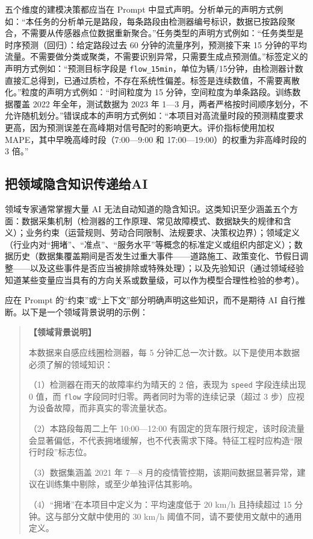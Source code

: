 五个维度的建模决策都应当在 Prompt 中显式声明。分析单元的声明方式例如：“本任务的分析单元是路段，每条路段由检测器编号标识，数据已按路段聚合，不需要从传感器点位数据重新聚合。”任务类型的声明方式例如：“任务类型是时序预测（回归）：给定路段过去 60 分钟的流量序列，预测接下来 15 分钟的平均流量。不需要做分类或聚类，不需要识别异常，只需要生成点预测值。”标签定义的声明方式例如：“预测目标字段是 \texttt{flow\_15min}，单位为辆/15分钟，由检测器计数直接汇总得到，已通过质检，不存在系统性偏差。标签是连续数值，不需要离散化。”粒度的声明方式例如：“时间粒度为 15 分钟，空间粒度为单条路段。训练数据覆盖 2022 年全年，测试数据为 2023 年 1—3 月，两者严格按时间顺序划分，不允许随机划分。”错误成本的声明方式例如：“本项目对高流量时段的预测精度要求更高，因为预测误差在高峰期对信号配时的影响更大。评价指标使用加权 MAPE，其中早晚高峰时段（7:00—9:00 和 17:00—19:00）的权重为非高峰时段的 3 倍。”

\subsection{把领域隐含知识传递给AI}

领域专家通常掌握大量 AI 无法自动知道的隐含知识。这类知识至少涵盖五个方面：数据采集机制（检测器的工作原理、常见故障模式、数据缺失的规律和含义）；业务约束（运营规则、劳动合同限制、法规要求、决策权边界）；领域定义（行业内对“拥堵”、“准点”、“服务水平”等概念的标准定义或组织内部定义）；数据历史（数据集覆盖期间是否发生过重大事件——道路施工、政策变化、节假日调整——以及这些事件是否应当被排除或特殊处理）；以及先验知识（通过领域经验知道某些变量应当具有的方向关系或数量级，可以作为模型合理性检验的参考）。

应在 Prompt 的“约束”或“上下文”部分明确声明这些知识，而不是期待 AI 自行推断。以下是一个领域背景说明的示例：

\begin{quote}
\textbf{【领域背景说明】}

本数据来自感应线圈检测器，每 5 分钟汇总一次计数。以下是使用本数据必须了解的领域知识：

（1）检测器在雨天的故障率约为晴天的 2 倍，表现为 \texttt{speed} 字段连续出现 0 值，而 \texttt{flow} 字段同时归零。两者同时为零的连续记录（超过 3 步）应视为设备故障，而非真实的零流量状态。

（2）本路段每周二上午 10:00—12:00 有固定的货车限行规定，该时段流量会显著偏低，不代表拥堵缓解，也不代表需求下降。特征工程时应构造“限行时段”标志位。

（3）数据集涵盖 2021 年 7—8 月的疫情管控期，该期间数据显著异常，建议在训练集中剔除，或至少单独评估其影响。

（4）“拥堵”在本项目中定义为：平均速度低于 20 km/h 且持续超过 15 分钟。这与部分文献中使用的 30 km/h 阈值不同，请不要使用文献中的通用定义。
\end{quote}

